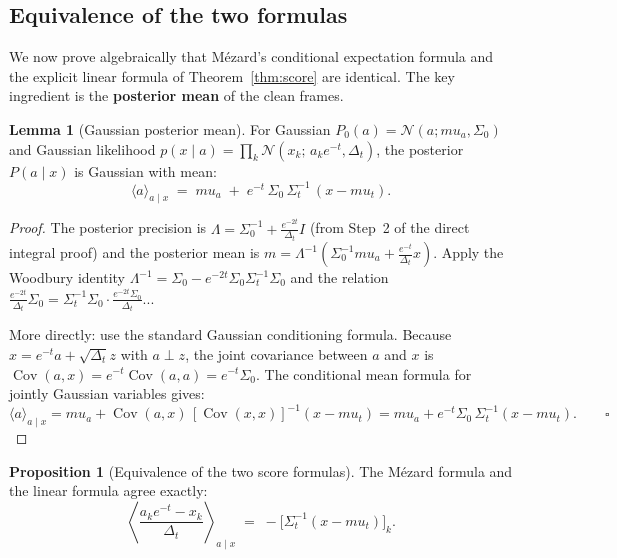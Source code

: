 \documentclass[12pt, a4paper]{article}
\def\ba{a}%
\def\bx{x}%
\def\bmu{mu}%
\def\bm#1{#1}%
\theoremstyle{definition}
\newtheorem{proposition}{Proposition}[section]
\newtheorem{lemma}{Lemma}[section]
\newcommand{\Cov}{\operatorname{Cov}}
\newcommand{\N}{\mathcal{N}}
\newcommand{\ba}{\bm{a}}
\newcommand{\bx}{\bm{x}}
\newcommand{\bmu}{\bm{\mu}}
\newcommand{\bz}{\bm{z}}
\newcommand{\dt}{\Delta_t}
\begin{document}
\subsection{Equivalence of the two formulas}

We now prove algebraically that M\'ezard's conditional expectation formula
and the explicit linear formula of Theorem~\ref{thm:score} are identical.
The key ingredient is the \textbf{posterior mean} of the clean frames.

\begin{lemma}[Gaussian posterior mean]\label{lem:postmean}
For Gaussian $P_0(\ba) = \N(\ba;\bmu_a,\Sigma_0)$ and Gaussian
likelihood $p(\bx\mid\ba) = \prod_k\N(x_k;\,a_ke^{-t},\dt)$,
the posterior $P(\ba\mid\bx)$ is Gaussian with mean:
\[
  \langle\ba\rangle_{\ba\mid\bx}
  \;=\;
  \bmu_a \;+\; e^{-t}\,\Sigma_0\,\Sigma_t^{-1}\,(\bx - \bmu_t).
\]
\end{lemma}

\begin{proof}
The posterior precision is $\Lambda = \Sigma_0^{-1}+\frac{e^{-2t}}{\dt}I$
(from Step~2 of the direct integral proof) and the posterior mean is
$\bm{m} = \Lambda^{-1}(\Sigma_0^{-1}\bmu_a + \frac{e^{-t}}{\dt}\bx)$.
Apply the Woodbury identity $\Lambda^{-1} = \Sigma_0 - e^{-2t}\Sigma_0\Sigma_t^{-1}\Sigma_0$
and the relation $\frac{e^{-2t}}{\dt}\Sigma_0 = \Sigma_t^{-1}\Sigma_0\cdot\frac{e^{-2t}\Sigma_0}{\dt}$...

More directly: use the standard Gaussian conditioning formula.
Because $\bx = e^{-t}\ba + \sqrt{\dt}\bz$ with $\ba\perp\bz$,
the joint covariance between $\ba$ and $\bx$ is
$\Cov(\ba,\bx) = e^{-t}\Cov(\ba,\ba) = e^{-t}\Sigma_0$.
The conditional mean formula for jointly Gaussian variables gives:
\[
  \langle\ba\rangle_{\ba\mid\bx}
  = \bmu_a + \Cov(\ba,\bx)\,[\Cov(\bx,\bx)]^{-1}(\bx-\bmu_t)
  = \bmu_a + e^{-t}\Sigma_0\,\Sigma_t^{-1}(\bx-\bmu_t). \qquad\square
\]
\end{proof}

\begin{proposition}[Equivalence of the two score formulas]
The M\'ezard formula and the linear formula agree exactly:
\[
  \left\langle\frac{a_k e^{-t}-x_k}{\dt}\right\rangle_{\!\ba\mid\bx}
  \;=\;
  -\bigl[\Sigma_t^{-1}(\bx-\bmu_t)\bigr]_k.
\]
\end{proposition}
\end{document}
